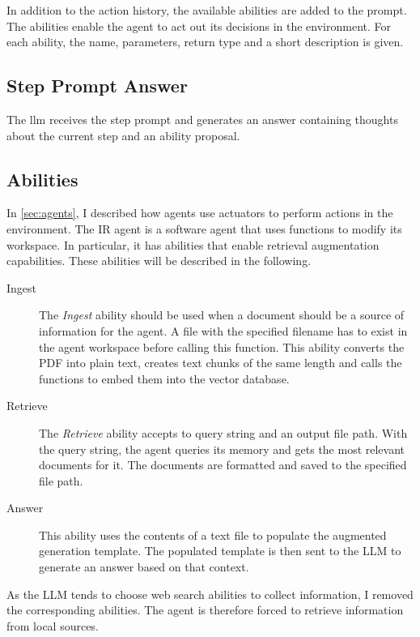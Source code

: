 \documentclass[../main.tex]{subfiles}
\begin{document}
In addition to the action history, the available abilities are added to the prompt.
The abilities enable the agent to act out its decisions in the environment.
For each ability, the name, parameters, return type and a short description is given.

\subsection{Step Prompt Answer}

The \gls{llm} receives the step prompt and generates an answer containing
thoughts about the current step and an ability proposal.


\subsection{Abilities}

In \autoref{sec:agents}, I described how agents use actuators to perform actions in the environment.
The IR agent is a software agent that uses functions to modify its workspace.
In particular, it has abilities that enable retrieval augmentation capabilities.
These abilities will be described in the following.

\begin{description}
    \item[Ingest] The \emph{Ingest} ability should be used
          when a document should be a source of information for the agent.
          A file with the specified filename has to exist in the agent workspace before calling this function.
          This ability converts the PDF into plain text, creates text chunks of the same length
          and calls the functions to embed them into the vector database.
    \item[Retrieve] The \emph{Retrieve} ability accepts to query string and an output file path.
          With the query string, the agent queries its memory and gets the most relevant documents for it.
          The documents are formatted and saved to the specified file path.
    \item[Answer] This ability uses the contents of a text file to populate the augmented generation template.
          The populated template is then sent to the LLM to generate an answer based on that context.

\end{description}

As the LLM tends to choose web search abilities to collect information, I removed the corresponding abilities.
The agent is therefore forced to retrieve information from local sources.
\end{document}
